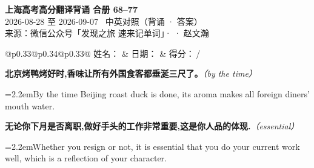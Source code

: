 \documentclass[11pt,a4paper]{article}
\newcommand{\num}[1]{\makebox[1.9em][r]{#1.}\hspace{0.3em}}
\newcommand{\prompt}[1]{\emph{\textcolor{tipblue}{\small（#1）}}}
\begin{document}
\pagestyle{plain}
\begin{center}
{\LARGE\bfseries 上海高考高分翻译背诵 \quad 合册 68–77}\\[0.25em]
{\large 2026-08-28 至 2026-09-07 \quad\ 中英对照（背诵 · 答案）}\\[0.35em]
{\footnotesize 来源：微信公众号「发现之旅 速来记单词」·  · 赵文瀚}
\end{center}

\vspace{0.4em}
\noindent\begin{tabular}{@{}p{0.33\textwidth}@{}p{0.34\textwidth}@{}p{0.33\textwidth}@{}}
姓名：\underline{\hspace{2.0cm}} & 日期：\underline{\hspace{2.0cm}} & 得分：\underline{\hspace{1.4cm}}\,/ \\
\end{tabular}

\vspace{0.5em}

\vspace{0.8em}
\vspace{0.35em}\vspace{0.15em}

\begin{minipage}{\linewidth}

\num{1}\textbf{北京烤鸭烤好时,香味让所有外国食客都垂涎三尺了。}\prompt{by the time}

\vspace{0.15em}

\noindent\hangindent=2.2em\hspace{2.2em}By the time Beijing roast duck is done, its aroma makes all foreign diners’ mouth water.

\end{minipage}

\begin{minipage}{\linewidth}

\num{2}\textbf{无论你下月是否离职,做好手头的工作非常重要,这是你人品的体现.}\prompt{essential}

\vspace{0.15em}

\noindent\hangindent=2.2em\hspace{2.2em}Whether you resign or not, it is essential that you do your current work well, which is a reflection of your character.

\end{minipage}
\end{document}
